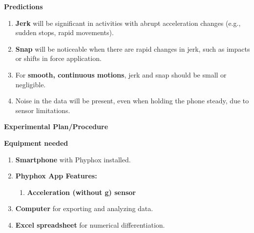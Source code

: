 \documentclass[idxtotoc,hyperref,openany]{labbook} %
\begin{document}
\hfill \break
\textbf{Predictions}
\begin{enumerate}[$\bullet$]
    \item \textbf{Jerk} will be significant in activities with abrupt acceleration changes (e.g., sudden stops, rapid movements).
    \item \textbf{Snap} will be noticeable when there are rapid changes in jerk, such as impacts or shifts in force application.
    \item For \textbf{smooth, continuous motions}, jerk and snap should be small or negligible.
    \item Noise in the data will be present, even when holding the phone steady, due to sensor limitations.
\end{enumerate}

\hfill \break
\textbf{Experimental Plan/Procedure}

\hfill \break
\textbf{Equipment needed}
\begin{enumerate}[$\bullet$]
    \item \textbf{Smartphone} with Phyphox installed.
    \item \textbf{Phyphox App Features:}
    \begin{enumerate}[$\bullet$]
        \item \textbf{Acceleration (without g) sensor}
    \end{enumerate}
    \item \textbf{Computer} for exporting and analyzing data.
    \item \textbf{Excel spreadsheet} for numerical differentiation.
\end{enumerate}
\end{document}

